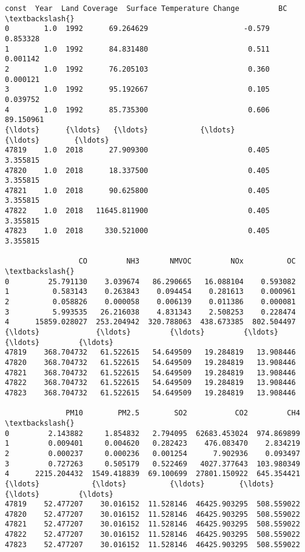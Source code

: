 \documentclass[11pt]{article}
\makeatletter
\newcommand{\boxspacing}{\kern\kvtcb@left@rule\kern\kvtcb@boxsep}
\newcommand{\prompt}[4]{
        {\ttfamily\llap{{\color{#2}[#3]:\hspace{3pt}#4}}\vspace{-\baselineskip}}
    }
\makeatother
\begin{document}
            \begin{tcolorbox}[breakable, size=fbox, boxrule=.5pt, pad at break*=1mm, opacityfill=0]
\prompt{Out}{outcolor}{7}{\boxspacing}
\begin{Verbatim}[commandchars=\\\{\}]
       const  Year  Land Coverage  Surface Temperature Change         BC  \textbackslash{}
0        1.0  1992      69.264629                      -0.579   0.853328
1        1.0  1992      84.831480                       0.511   0.001142
2        1.0  1992      76.205103                       0.360   0.000121
3        1.0  1992      95.192667                       0.105   0.039752
4        1.0  1992      85.735300                       0.606  89.150961
{\ldots}      {\ldots}   {\ldots}            {\ldots}                         {\ldots}        {\ldots}
47819    1.0  2018      27.909300                       0.405   3.355815
47820    1.0  2018      18.337500                       0.405   3.355815
47821    1.0  2018      90.625800                       0.405   3.355815
47822    1.0  2018   11645.811900                       0.405   3.355815
47823    1.0  2018     330.521000                       0.405   3.355815

                 CO         NH3       NMVOC         NOx          OC  \textbackslash{}
0         25.791130    3.039674   86.290665   16.088104    0.593082
1          0.583143    0.263843    0.094454    0.281613    0.000961
2          0.058826    0.000058    0.006139    0.011386    0.000081
3          5.993535   26.216038    4.831343    2.508253    0.228474
4      15859.028027  253.204942  320.788063  438.673385  802.504497
{\ldots}             {\ldots}         {\ldots}         {\ldots}         {\ldots}         {\ldots}
47819    368.704732   61.522615   54.649509   19.284819   13.908446
47820    368.704732   61.522615   54.649509   19.284819   13.908446
47821    368.704732   61.522615   54.649509   19.284819   13.908446
47822    368.704732   61.522615   54.649509   19.284819   13.908446
47823    368.704732   61.522615   54.649509   19.284819   13.908446

              PM10        PM2.5        SO2           CO2         CH4  \textbackslash{}
0         2.143882     1.854832   2.794095  62683.453024  974.869899
1         0.009401     0.004620   0.282423    476.083470    2.834219
2         0.000237     0.000236   0.001254      7.902936    0.093497
3         0.727263     0.505179   0.522469   4027.377643  103.980349
4      2215.204432  1549.418839  69.100699  27801.150922  645.354421
{\ldots}            {\ldots}          {\ldots}        {\ldots}           {\ldots}         {\ldots}
47819    52.477207    30.016152  11.528146  46425.903295  508.559022
47820    52.477207    30.016152  11.528146  46425.903295  508.559022
47821    52.477207    30.016152  11.528146  46425.903295  508.559022
47822    52.477207    30.016152  11.528146  46425.903295  508.559022
47823    52.477207    30.016152  11.528146  46425.903295  508.559022


\end{Verbatim}
\end{tcolorbox}
\end{document}
